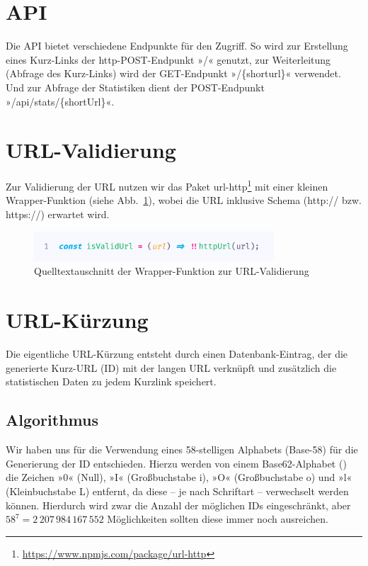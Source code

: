 \documentclass[a4paper,11pt,DIV=12,overfullrule=on]{scrreprt}%
\begin{document}
\section{API}
Die \ac{API} bietet verschiedene Endpunkte für den Zugriff. So wird zur Erstellung eines Kurz-Links der http-POST-Endpunkt »{\ttfamily /}« genutzt, zur Weiterleitung (Abfrage des Kurz-Links) wird der GET-Endpunkt »{\ttfamily /\{shorturl\}}« verwendet. Und zur Abfrage der Statistiken dient der POST-Endpunkt »{\ttfamily /api/stats/\{shortUrl\}}«. 
\section{URL-Validierung}
Zur Validierung der URL nutzen wir das Paket {\ttfamily url-http}\footnote{\href{https://www.npmjs.com/package/url-http}{https://www.npmjs.com/package/url-http}} mit einer kleinen Wrapper-Funktion (siehe Abb.~\ref{fig:25wrapper}), wobei die \ac{URL} inklusive Schema ({\ttfamily http://} bzw. {\ttfamily https://}) erwartet wird.
\begin{figure}[h]%
    \begin{small}%
        \begin{center}%
            \includegraphics[width=0.8\textwidth]{2_5_wrapper.png}%
        \end{center}%
        \caption{Quelltextauschnitt der Wrapper-Funktion zur \ac{URL}-Validierung}%
        \label{fig:25wrapper}%
    \end{small}%
\end{figure}%

\section{URL-Kürzung}
Die eigentliche URL-Kürzung entsteht durch einen Datenbank-Eintrag, der die generierte Kurz-\ac{URL} (ID) mit der langen \ac{URL} verknüpft und zusätzlich die statistischen Daten zu jedem Kurzlink speichert.
\subsection{Algorithmus}
Wir haben uns für die Verwendung eines 58-stelligen Alphabets (Base-58) für die Generierung der ID entschieden. Hierzu werden von einem Base62-Alphabet ({\ttfamily[0–9A–Za–z]}) die Zeichen »0« (Null), »I« (Großbuchstabe i), »O« (Großbuchstabe o) und »l« (Kleinbuchstabe L) entfernt, da diese – je nach Schriftart – verwechselt werden können. Hierdurch wird zwar die Anzahl der möglichen IDs eingeschränkt, aber $58^7 =  2\,207\,984\,167\,552$ Möglichkeiten sollten diese immer noch ausreichen.
\end{document}
